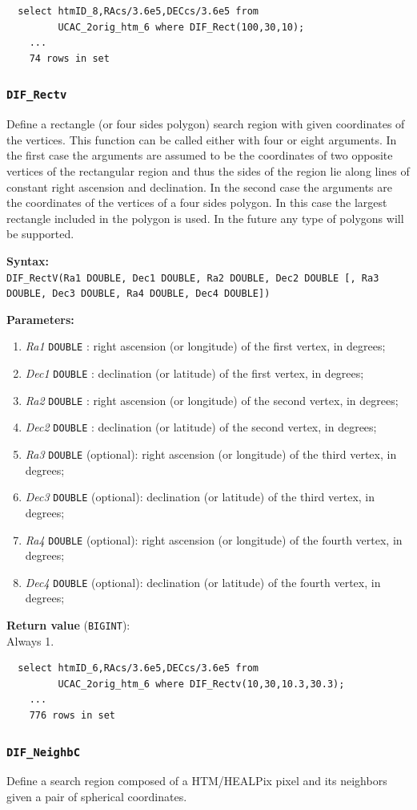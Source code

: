 \documentclass[10pt,titlepage]{article}
\newcommand{\syntax}[1]
{
  \bigskip
  \noindent
  \textbf{Syntax:} \\ 
  \indent \texttt{#1}
}
\newenvironment{parameters}
{
  \medskip
  \noindent
  \textbf{Parameters:}
  \begin{enumerate}
}
{
  \end{enumerate}
}
\newcommand{\param}[2]
{
  \item \textit{#1} \texttt{#2} 
}
\newcommand{\return}[1]
{
  \medskip
  \noindent
  \textbf{Return value} (\texttt{#1}): \\
  \indent
}
\newcommand{\example}
{
\medskip
\noindent{\textbf{Example:}}
}
\begin{document}
\example
%
\begin{verbatim}
  select htmID_8,RAcs/3.6e5,DECcs/3.6e5 from
         UCAC_2orig_htm_6 where DIF_Rect(100,30,10);
    ...
    74 rows in set
\end{verbatim}
%
%

\subsubsection{{\tt DIF\_Rectv}}
Define a rectangle (or four sides polygon) search region with given
coordinates of the vertices. This function can be called either with four or eight
arguments. In the first case the arguments are assumed to be the
coordinates of two opposite vertices of the rectangular region and thus
the sides of the region lie along lines of constant right ascension
and declination. In the second case the arguments are
the coordinates of the vertices of a four sides polygon.
In this case the largest rectangle included in the polygon is used. 
In the future any type of polygons will be supported.

\syntax{DIF\_RectV(Ra1 DOUBLE, Dec1 DOUBLE, Ra2
  DOUBLE, Dec2 DOUBLE [, Ra3 DOUBLE, Dec3 DOUBLE,
  Ra4 DOUBLE, Dec4 DOUBLE])}

\begin{parameters}
  \param{Ra1}{DOUBLE}: right ascension (or longitude) of the
  first vertex, in degrees;
  \param{Dec1}{DOUBLE}: declination (or latitude) of the first
  vertex, in degrees;
  \param{Ra2}{DOUBLE}: right ascension (or longitude) of the
  second vertex, in degrees;
  \param{Dec2}{DOUBLE}: declination (or latitude) of the second
  vertex, in degrees;
  \param{Ra3}{DOUBLE} (optional): right ascension (or longitude)
  of the third vertex, in degrees;
  \param{Dec3}{DOUBLE} (optional): declination (or latitude) of
  the third vertex, in degrees;
  \param{Ra4}{DOUBLE} (optional): right ascension (or longitude)
  of the fourth vertex, in degrees;
  \param{Dec4}{DOUBLE} (optional): declination (or latitude) of
  the fourth vertex, in degrees;
\end{parameters}

\return{BIGINT} Always 1.

\example
%
\begin{verbatim}
  select htmID_6,RAcs/3.6e5,DECcs/3.6e5 from
         UCAC_2orig_htm_6 where DIF_Rectv(10,30,10.3,30.3);
    ...
    776 rows in set
\end{verbatim}
%
%

\subsubsection{{\tt DIF\_NeighbC}}
Define a search region composed of a HTM/HEALPix pixel and its
neighbors given a pair of spherical coordinates.
\end{document}

